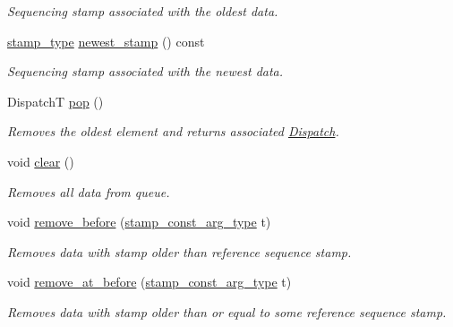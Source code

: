 \begin{DoxyCompactItemize}
\begin{DoxyCompactList}\small\item\em Sequencing stamp associated with the oldest data. \end{DoxyCompactList}\item 
\hyperlink{classflow_1_1_dispatch_queue_a7908f3d78b7f1767462244b94434d748}{stamp\+\_\+type} \hyperlink{classflow_1_1_dispatch_queue_a5ced281bc5c221a79bf88a6169429252}{newest\+\_\+stamp} () const
\begin{DoxyCompactList}\small\item\em Sequencing stamp associated with the newest data. \end{DoxyCompactList}\item 
DispatchT \hyperlink{classflow_1_1_dispatch_queue_a10607f6122683a4e24b44daaf8bf51fe}{pop} ()
\begin{DoxyCompactList}\small\item\em Removes the oldest element and returns associated \hyperlink{classflow_1_1_dispatch}{Dispatch}. \end{DoxyCompactList}\item 
\mbox{\label{classflow_1_1_dispatch_queue_a184d59ca79ec916af7c2866eb1d3fa6e}} 
void \hyperlink{classflow_1_1_dispatch_queue_a184d59ca79ec916af7c2866eb1d3fa6e}{clear} ()
\begin{DoxyCompactList}\small\item\em Removes all data from queue. \end{DoxyCompactList}\item 
void \hyperlink{classflow_1_1_dispatch_queue_aabb451448562a4084506fc5c3289e0b0}{remove\+\_\+before} (\hyperlink{classflow_1_1_dispatch_queue_affc83531dc53ee147899a33e82a6cbf0}{stamp\+\_\+const\+\_\+arg\+\_\+type} t)
\begin{DoxyCompactList}\small\item\em Removes data with stamp older than reference sequence stamp. \end{DoxyCompactList}\item 
void \hyperlink{classflow_1_1_dispatch_queue_a44bbaa95fa99125929edb0dbd511a73a}{remove\+\_\+at\+\_\+before} (\hyperlink{classflow_1_1_dispatch_queue_affc83531dc53ee147899a33e82a6cbf0}{stamp\+\_\+const\+\_\+arg\+\_\+type} t)
\begin{DoxyCompactList}\small\item\em Removes data with stamp older than or equal to some reference sequence stamp. \end{DoxyCompactList}\item 

\end{DoxyCompactItemize}
